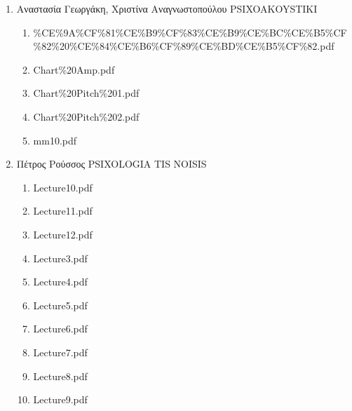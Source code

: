 \documentclass[11pt]{article}
\begin{document}
\begin{enumerate}
\begin{enumerate}
\begin{enumerate}
\item Αναστασία Γεωργάκη, Χριστίνα Αναγνωστοπούλου PSIXOAKOYSTIKI
\label{sec-1-1-1-1-49-2-2-1-74-5}
\begin{enumerate}
\item \%CE\%9A\%CF\%81\%CE\%B9\%CF\%83\%CE\%B9\%CE\%BC\%CE\%B5\%CF\%82\%20\%CE\%84\%CE\%B6\%CF\%89\%CE\%BD\%CE\%B5\%CF\%82.pdf
\label{sec-1-1-1-1-49-2-2-1-74-5-1}

\item Chart\%20Amp.pdf
\label{sec-1-1-1-1-49-2-2-1-74-5-2}

\item Chart\%20Pitch\%201.pdf
\label{sec-1-1-1-1-49-2-2-1-74-5-3}

\item Chart\%20Pitch\%202.pdf
\label{sec-1-1-1-1-49-2-2-1-74-5-4}

\item mm10.pdf
\label{sec-1-1-1-1-49-2-2-1-74-5-5}
\end{enumerate}

\item Πέτρος Ρούσσος PSIXOLOGIA TIS NOISIS
\label{sec-1-1-1-1-49-2-2-1-74-6}
\begin{enumerate}
\item Lecture10.pdf
\label{sec-1-1-1-1-49-2-2-1-74-6-1}

\item Lecture11.pdf
\label{sec-1-1-1-1-49-2-2-1-74-6-2}

\item Lecture12.pdf
\label{sec-1-1-1-1-49-2-2-1-74-6-3}

\item Lecture3.pdf
\label{sec-1-1-1-1-49-2-2-1-74-6-4}

\item Lecture4.pdf
\label{sec-1-1-1-1-49-2-2-1-74-6-5}

\item Lecture5.pdf
\label{sec-1-1-1-1-49-2-2-1-74-6-6}

\item Lecture6.pdf
\label{sec-1-1-1-1-49-2-2-1-74-6-7}

\item Lecture7.pdf
\label{sec-1-1-1-1-49-2-2-1-74-6-8}

\item Lecture8.pdf
\label{sec-1-1-1-1-49-2-2-1-74-6-9}

\item Lecture9.pdf
\label{sec-1-1-1-1-49-2-2-1-74-6-10}


\end{enumerate}
\end{enumerate}
\end{enumerate}
\end{enumerate}
\end{document}
